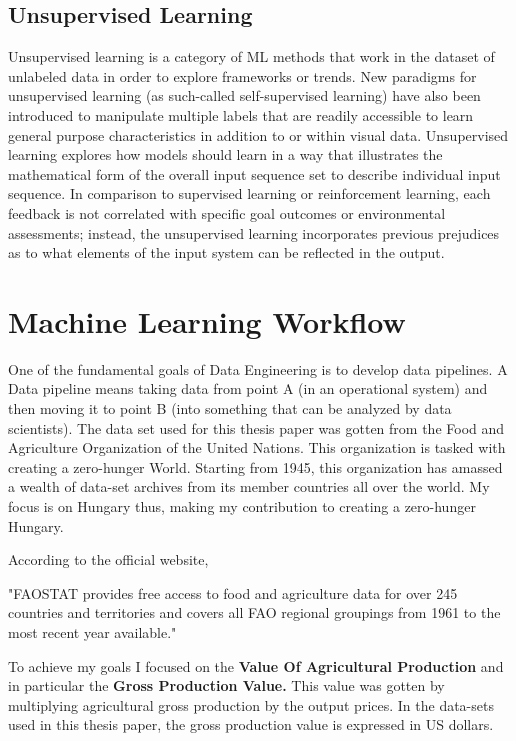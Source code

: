 \subsection{Unsupervised Learning}
Unsupervised learning is a category of ML methods that work in the dataset of unlabeled data in order to explore frameworks or trends. New paradigms for unsupervised learning (as such-called self-supervised learning) have also been introduced to manipulate multiple labels that are readily accessible to learn general purpose characteristics in addition to or within visual data.\cite{dayan1999unsupervised}
Unsupervised learning explores how models should learn in a way that illustrates the mathematical form of the overall input sequence set to describe individual input sequence. In comparison to supervised learning or reinforcement learning, each feedback is not correlated with specific goal outcomes or environmental assessments; instead, the unsupervised learning incorporates previous prejudices as to what elements of the input system can be reflected in the output.\cite{dayan1999unsupervised}



\section{Machine Learning Workflow}
One of the fundamental goals of Data Engineering is to develop data pipelines. A Data pipeline means taking data from point A (in an operational system) and then moving it to point B (into something that can be analyzed by data scientists).
The data set used for this thesis paper was gotten from the Food and Agriculture Organization of the United Nations. This organization is tasked with creating a zero-hunger World. Starting from 1945, this organization has amassed a wealth of data-set archives from its member countries all over the world. My focus is on Hungary thus, making my contribution to creating a zero-hunger Hungary.

According to the official website,\cite{division_2000}
\begin{displayquote}
	"FAOSTAT provides free access to food and agriculture data for over 245 countries and territories and covers all FAO regional groupings from 1961 to the most recent year available."
\end{displayquote} 

To achieve my goals I focused on the \textbf{Value Of Agricultural Production} and in particular the \textbf{Gross Production Value.} This value was gotten by multiplying agricultural gross production by the output prices. In the data-sets used in this thesis paper, the gross production value is expressed in US dollars. 




